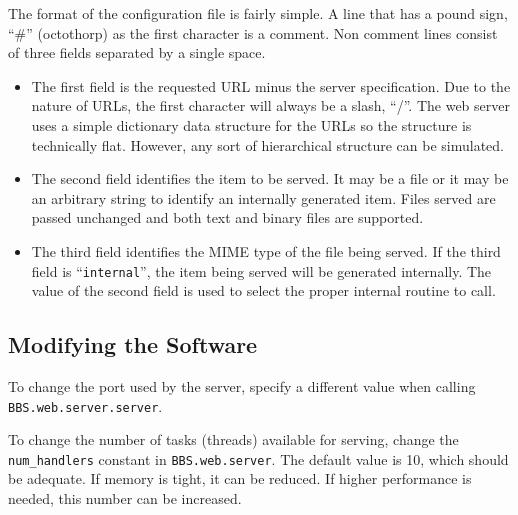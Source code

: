 \documentclass[10pt, openany]{book}
\newcommand{\package}[1]{\texttt{#1}}
\newcommand{\function}[1]{\texttt{#1}}
\newcommand{\keyword}[1]{\texttt{#1}}
\begin{document}
The format of the configuration file is fairly simple.  A line that has a pound sign, ``\#'' (octothorp) as the first character is a comment.  Non comment lines consist of three fields separated by a single space.
\begin{itemize}
  \item The first field is the requested URL minus the server specification.  Due to the nature of URLs, the first character will always be a slash, ``/''.  The web server uses a simple dictionary data structure for the URLs so the structure is technically flat.  However, any sort of hierarchical structure can be simulated.
  \item The second field identifies the item to be served.  It may be a file or it may be an arbitrary string to identify an internally generated item.  Files served are passed unchanged and both text and binary files are supported.
  \item The third field identifies the MIME type of the file being served.  If the third field is ``\keyword{internal}'', the item being served will be generated internally.  The value of the second field is used to select the proper internal routine to call.
\end{itemize}

\subsection{Modifying the Software}
To change the port used by the server, specify a different value when calling \function{BBS.web.server.server}.

To change the number of tasks (threads) available for serving, change the \keyword{num\_handlers} constant in \package{BBS.web.server}.  The default value is 10, which should be adequate.  If memory is tight, it can be reduced. If higher performance is needed, this number can be increased.
\end{document}
